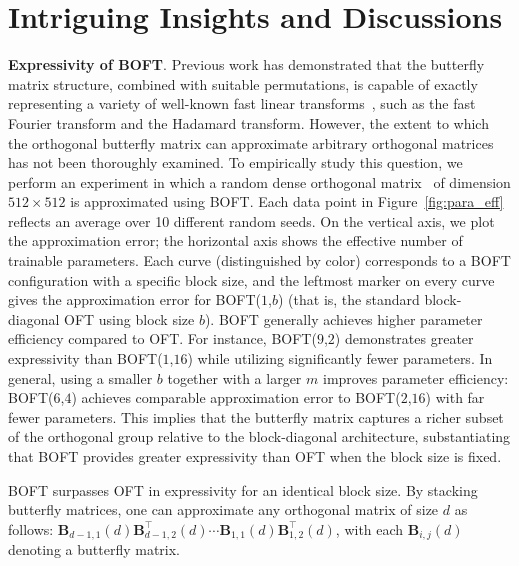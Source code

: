 \section{Intriguing Insights and Discussions}

\textbf{Expressivity of BOFT}. Previous work has demonstrated that the butterfly matrix structure, combined with suitable permutations, is capable of exactly representing a variety of well-known fast linear transforms~\cite{dao2019learning,dao2019kaleidoscope}, such as the fast Fourier transform and the Hadamard transform. However, the extent to which the orthogonal butterfly matrix can approximate arbitrary orthogonal matrices has not been thoroughly examined. To empirically study this question, we perform an experiment in which a random dense orthogonal matrix~\cite{anderson1987generation} of dimension $512 \times 512$ is approximated using BOFT. Each data point in Figure~\ref{fig:para_eff} reflects an average over 10 different random seeds. On the vertical axis, we plot the approximation error; the horizontal axis shows the effective number of trainable parameters. Each curve (distinguished by color) corresponds to a BOFT configuration with a specific block size, and the leftmost marker on every curve gives the approximation error for BOFT($1$,$b$) (that is, the standard block-diagonal OFT using block size $b$). BOFT generally achieves higher parameter efficiency compared to OFT. For instance, BOFT($9$,$2$) demonstrates greater expressivity than BOFT($1$,$16$) while utilizing significantly fewer parameters. In general, using a smaller $b$ together with a larger $m$ improves parameter efficiency: BOFT($6$,$4$) achieves comparable approximation error to BOFT($2$,$16$) with far fewer parameters. This implies that the butterfly matrix captures a richer subset of the orthogonal group relative to the block-diagonal architecture, substantiating that BOFT provides greater expressivity than OFT when the block size is fixed.

\begin{theorem}\label{thm:exp_boft}
    BOFT surpasses OFT in expressivity for an identical block size. By stacking butterfly matrices, one can approximate any orthogonal matrix of size $d$ as follows: $\bm{B}_{d-1,1}(d)\bm{B}^\top_{d-1,2}(d)\cdots\bm{B}_{1,1}(d)\bm{B}^\top_{1,2}(d)$, with each $\bm{B}_{i,j}(d)$ denoting a butterfly matrix.
\end{theorem}

